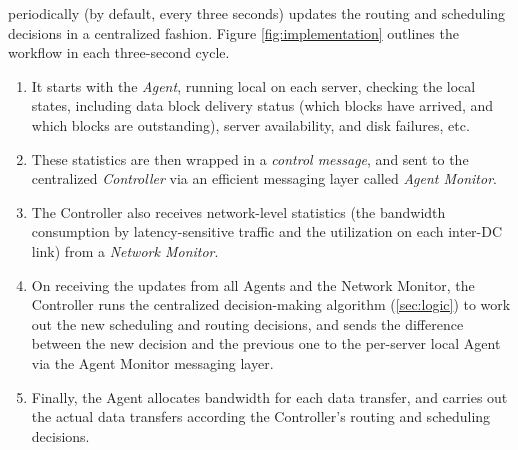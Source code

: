 \name periodically (by default, every three seconds) updates the 
routing and scheduling decisions in a centralized fashion. 
Figure \ref{fig:implementation} outlines the workflow in each 
three-second cycle. 
\begin{enumerate}
\item It starts with the {\em Agent}, running local on each server,
checking the local states, including data block delivery status 
(which blocks have arrived, and which blocks are outstanding), 
server availability, and disk failures, etc. 
\item These statistics are then wrapped in a {\em control message}, 
and sent to the centralized {\em \name Controller} via an efficient 
messaging layer called {\em Agent Monitor}. 
\item The \name Controller also receives network-level statistics 
(the bandwidth consumption by latency-sensitive traffic and the 
utilization on each inter-DC link) from a {\em Network Monitor}. 
\item On receiving the updates from all Agents and the Network 
Monitor, the \name Controller runs the centralized decision-making 
algorithm (\Section\ref{sec:logic}) to work out the new scheduling 
and routing decisions, and sends the difference between the new 
decision and the previous one to the per-server local Agent via 
the Agent Monitor messaging layer.
\item Finally, the Agent allocates bandwidth for each data transfer, 
and carries out the actual data transfers according the Controller's 
routing and scheduling decisions.
\end{enumerate}


